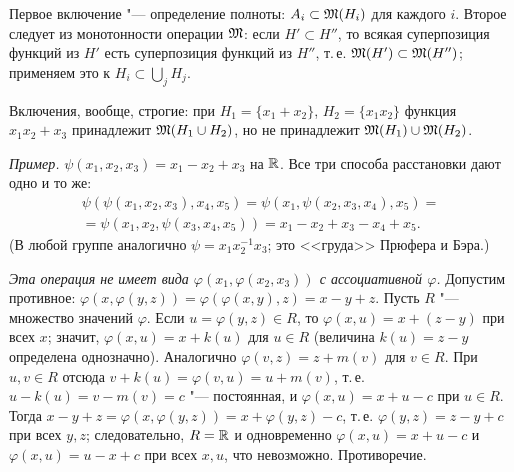\begin{solution}[5 (\S\,4)]
Первое включение "--- определение полноты: $A_i\subset\mathfrak M(H_i)$ для
каждого $i$. Второе следует из монотонности операции $\mathfrak M$: если
$H'\subset H''$, то всякая суперпозиция функций из $H'$ есть суперпозиция
функций из $H''$, т.\,е. $\mathfrak M(H')\subset\mathfrak M(H'')$; применяем это
к $H_i\subset\bigcup_jH_j$.

Включения, вообще, строгие: при $H_1=\{x_1+x_2\}$, $H_2=\{x_1x_2\}$
функция $x_1x_2+x_3$ принадлежит $\mathfrak M(H_1\cup H_2)$, но не принадлежит
$\mathfrak M(H_1)\cup\mathfrak M(H_2)$.
\end{solution}

\begin{solution}[6 (\S\,4)]
\emph{Пример.} $\psi(x_1,x_2,x_3)=x_1-x_2+x_3$ на $\mathbb R$. Все три способа
расстановки дают одно и то же:
\begin{multline*}
\psi(\psi(x_1,x_2,x_3),x_4,x_5)=\psi(x_1,\psi(x_2,x_3,x_4),x_5)={}\\
=\psi(x_1,x_2,\psi(x_3,x_4,x_5))=x_1-x_2+x_3-x_4+x_5 .
\end{multline*}
(В любой группе аналогично $\psi=x_1x_2^{-1}x_3$; это <<груда>> Прюфера
и Бэра.)

\emph{Эта операция не имеет вида $\varphi(x_1,\varphi(x_2,x_3))$
с ассоциативной $\varphi$.} Допустим противное:
$\varphi(x,\varphi(y,z))=\varphi(\varphi(x,y),z)=x-y+z$. Пусть $R$ "---
множество значений $\varphi$. Если $u=\varphi(y,z)\in R$, то
$\varphi(x,u)=x+(z-y)$ при всех $x$; значит, $\varphi(x,u)=x+k(u)$ для
$u\in R$ (величина $k(u)=z-y$ определена однозначно). Аналогично
$\varphi(v,z)=z+m(v)$ для $v\in R$. При $u,v\in R$ отсюда
$v+k(u)=\varphi(v,u)=u+m(v)$, т.\,е. $u-k(u)=v-m(v)=c$ "--- постоянная, и
$\varphi(x,u)=x+u-c$ при $u\in R$. Тогда
$x-y+z=\varphi(x,\varphi(y,z))=x+\varphi(y,z)-c$, т.\,е.
$\varphi(y,z)=z-y+c$ при всех $y,z$; следовательно, $R=\mathbb R$ и одновременно
$\varphi(x,u)=x+u-c$ и $\varphi(x,u)=u-x+c$ при всех $x,u$, что
невозможно. Противоречие.


\end{solution}
